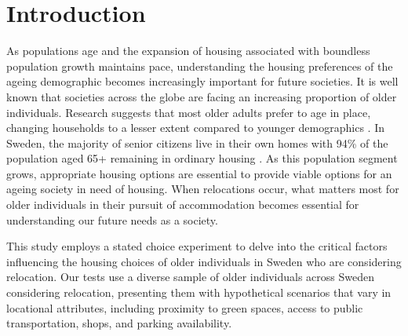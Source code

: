 \documentclass[3p,11pt ]{elsarticle}
\begin{document}
\begin{frontmatter}
\begin{abstract}
\end{abstract}
%
%
%
%
\end{frontmatter}


\newpage



\section{Introduction}

As populations age and the expansion of housing associated with boundless population growth maintains pace,
understanding the housing preferences of the ageing demographic becomes increasingly important for future societies.
It is well known that societies across the globe are facing an increasing proportion of older individuals.
Research suggests that most older adults prefer to age in place,
changing households to a lesser extent compared to younger demographics  \citep{abramssonChangingLocationsCentral2015}.
In Sweden, the majority of senior citizens live in their own homes with 94\% of the population aged 65+ remaining in ordinary housing \citep{jennbertDevelopmentsElderlyPolicy2009}.
As this population segment grows,
appropriate housing options are essential to provide viable options for an ageing society in need of housing.
When relocations occur,
what matters most for older individuals in their pursuit of accommodation becomes essential for understanding our future needs as a society.

This study employs a stated choice experiment to delve into the critical factors influencing the housing choices of older individuals in Sweden who are considering relocation.
Our tests use a diverse sample of older individuals across Sweden considering relocation, presenting them with hypothetical scenarios that vary in locational attributes, including proximity to green spaces, access to public transportation, shops, and parking availability.
\end{document}
